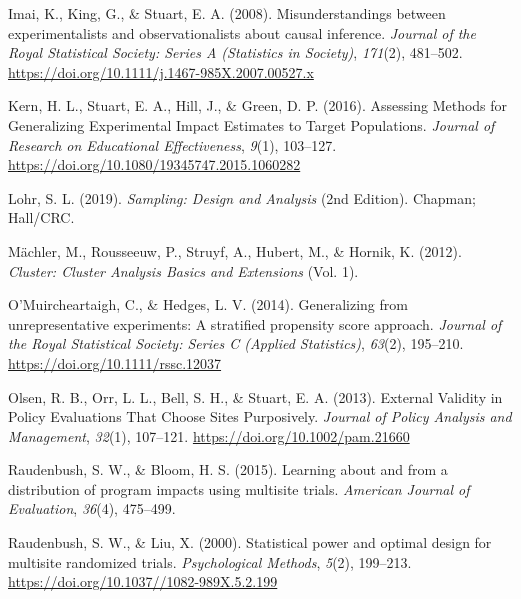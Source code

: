 \documentclass[
  man,floatsintext]{apa6}
\newlength{\cslhangindent}
\newlength{\cslentryspacingunit} %
\newenvironment{CSLReferences}[2] %
 {%
  \setlength{\parindent}{0pt}
  \ifodd #1
  \let\oldpar\par
  \def\par{\hangindent=\cslhangindent\oldpar}
  \fi
  \setlength{\parskip}{#2\cslentryspacingunit}
 }%
 {}
\begin{document}
\begin{CSLReferences}{1}{0}
\leavevmode{}%
Imai, K., King, G., \& Stuart, E. A. (2008). Misunderstandings between experimentalists and observationalists about causal inference. \emph{Journal of the Royal Statistical Society: Series A (Statistics in Society)}, \emph{171}(2), 481--502. \url{https://doi.org/10.1111/j.1467-985X.2007.00527.x}

\leavevmode{}%
Kern, H. L., Stuart, E. A., Hill, J., \& Green, D. P. (2016). Assessing {Methods} for {Generalizing Experimental Impact Estimates} to {Target Populations}. \emph{Journal of Research on Educational Effectiveness}, \emph{9}(1), 103--127. \url{https://doi.org/10.1080/19345747.2015.1060282}

\leavevmode{}%
Lohr, S. L. (2019). \emph{Sampling: {Design} and {Analysis}} (2nd Edition). Chapman; Hall/CRC.

\leavevmode{}%
Mächler, M., Rousseeuw, P., Struyf, A., Hubert, M., \& Hornik, K. (2012). \emph{Cluster: {Cluster Analysis Basics} and {Extensions}} (Vol. 1).

\leavevmode{}%
O'Muircheartaigh, C., \& Hedges, L. V. (2014). Generalizing from unrepresentative experiments: A stratified propensity score approach. \emph{Journal of the Royal Statistical Society: Series C (Applied Statistics)}, \emph{63}(2), 195--210. \url{https://doi.org/10.1111/rssc.12037}

\leavevmode{}%
Olsen, R. B., Orr, L. L., Bell, S. H., \& Stuart, E. A. (2013). External {Validity} in {Policy Evaluations That Choose Sites Purposively}. \emph{Journal of Policy Analysis and Management}, \emph{32}(1), 107--121. \url{https://doi.org/10.1002/pam.21660}

\leavevmode{}%
Raudenbush, S. W., \& Bloom, H. S. (2015). Learning about and from a distribution of program impacts using multisite trials. \emph{American Journal of Evaluation}, \emph{36}(4), 475--499.

\leavevmode{}%
Raudenbush, S. W., \& Liu, X. (2000). Statistical power and optimal design for multisite randomized trials. \emph{Psychological Methods}, \emph{5}(2), 199--213. \url{https://doi.org/10.1037//1082-989X.5.2.199}


\end{CSLReferences}
\end{document}
